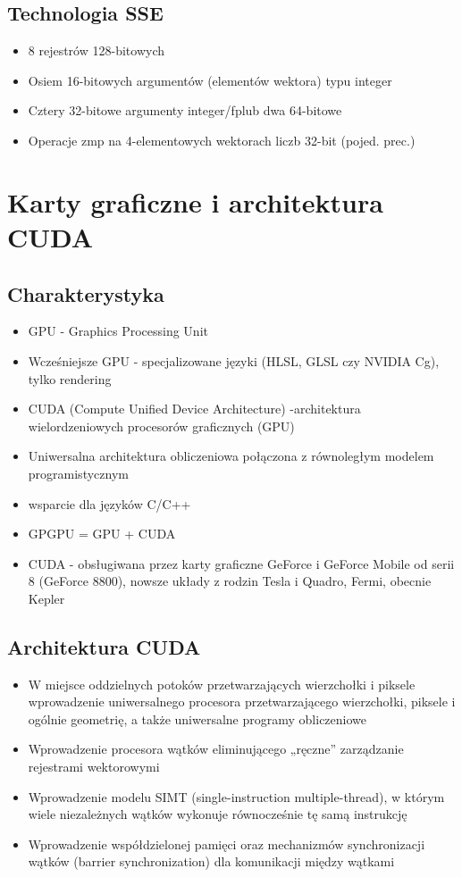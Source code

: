 	\subsection{Technologia SSE}
		\begin{itemize}
			\item 8 rejestrów 128-bitowych
			\item Osiem 16-bitowych argumentów (elementów wektora) typu integer
			\item Cztery 32-bitowe argumenty integer/fplub dwa 64-bitowe
			\item Operacje zmp na 4-elementowych wektorach liczb 32-bit (pojed. prec.)
		\end{itemize}

\section{Karty graficzne i architektura CUDA}
	\subsection{Charakterystyka}
		\begin{itemize}
			\item GPU - Graphics Processing Unit
			\item Wcześniejsze GPU - specjalizowane języki (HLSL, GLSL czy NVIDIA Cg), tylko rendering
			\item CUDA (Compute Unified Device Architecture) -architektura wielordzeniowych procesorów graficznych (GPU)
			\item Uniwersalna architektura obliczeniowa połączona z równoległym modelem programistycznym
			\item wsparcie dla języków C/C++
			\item GPGPU = GPU + CUDA
			\item CUDA - obsługiwana przez karty graficzne GeForce i GeForce Mobile od serii 8 (GeForce 8800), nowsze układy z rodzin Tesla i Quadro, Fermi, obecnie Kepler
		\end{itemize}
	\subsection{Architektura CUDA}
		\begin{itemize}
			\item W miejsce oddzielnych potoków przetwarzających wierzchołki i piksele wprowadzenie uniwersalnego procesora przetwarzającego wierzchołki, piksele i ogólnie geometrię, a także uniwersalne programy obliczeniowe
			\item Wprowadzenie procesora wątków eliminującego „ręczne” zarządzanie rejestrami wektorowymi
			\item Wprowadzenie modelu SIMT (single-instruction multiple-thread), w którym wiele niezależnych wątków wykonuje równocześnie tę samą instrukcję
			\item Wprowadzenie współdzielonej pamięci oraz mechanizmów synchronizacji wątków (barrier synchronization) dla komunikacji między wątkami
		\end{itemize}
